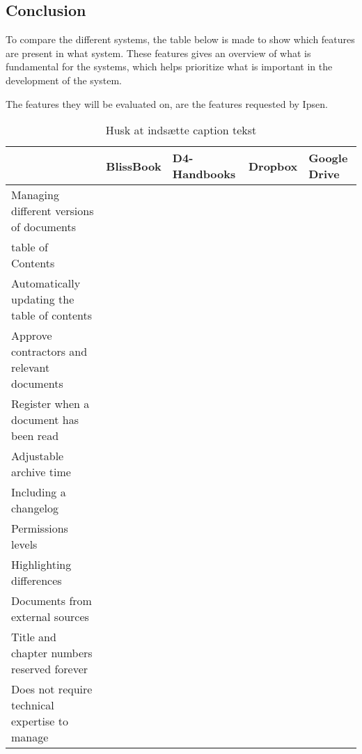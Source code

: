 \subsection{Conclusion}
To compare the different systems, the table below is made to show which features are present in what system. These features gives an overview of what is fundamental for the systems, which helps prioritize what is important in the development of the system.

The features they will be evaluated on, are the features requested by Ipsen.

\begin{table}[H]
	\begin{center}
		\begin{tabular}{| m{5cm}|m{1.6cm}|m{2cm}|m{1.5cm}|m{1.2cm}|}
			\hline
			 & BlissBook  & D4-Handbooks & Dropbox & Google \newline Drive \\ 
			\hline
			Managing different versions of documents & \checkmark &  &  & \\ 
			\hline
			table of Contents & \checkmark & \checkmark  & \checkmark & \checkmark \\ 
			\hline
			Automatically updating the table of contents & \checkmark & \checkmark  & \checkmark & \checkmark \\ 
			\hline
			Approve contractors and \newline relevant documents &  &  &  & \\ 
			\hline
			Register when a document has been read & \checkmark & \checkmark &  & \\ 
			\hline
			Adjustable archive time &  &  &  & \\ 
			\hline
			Including a changelog & \checkmark & \checkmark  & \checkmark & \checkmark \\ 
			\hline
			Permissions levels & \checkmark &  &  & \\ 
			\hline
			Highlighting differences & \checkmark &  &  & \\ 
			\hline
			Documents from external \newline sources &  &  & \checkmark & \checkmark \\ 
			\hline
			Title and chapter numbers \newline reserved forever &  &  &  & \\ 
			\hline
			Does not require technical \newline expertise to manage & \checkmark & \checkmark  & \checkmark & \checkmark \\ 
			\hline
		\end{tabular}
	\caption{{\color{red} Husk at indsætte caption tekst}}\label{tab:Exsisting}
	\end{center}
\end{table}

